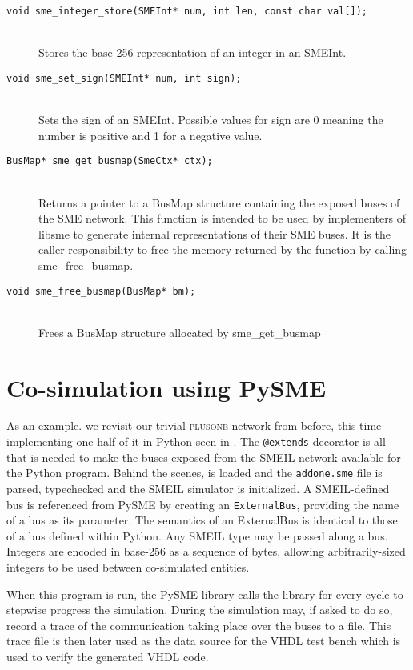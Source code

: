 \begin{description}
 \item[\texttt{void sme_integer_store(SMEInt* num, int len, const char val[]);}]\hfill\\
    Stores the base-256 representation of an integer in an SMEInt.
  \item[\texttt{void sme_set_sign(SMEInt* num, int sign);}]\hfill\\
    Sets the sign of an SMEInt. Possible values for sign are 0 meaning the number
    is positive and 1 for a negative value.
 \item[\texttt{BusMap* sme_get_busmap(SmeCtx* ctx);}]\hfill\\
   Returns a pointer to a BusMap structure containing the exposed buses of the
   SME network. This function is intended to be used by implementers of libsme
   to generate internal representations of their SME buses. It is the caller
   responsibility to free the memory returned by the function by calling
   sme_free_busmap.
\item[\texttt{void sme_free_busmap(BusMap* bm);}]\hfill\\
   Frees a BusMap structure allocated by sme_get_busmap
\end{description}

\section{Co-simulation using PySME}
As an example. we revisit our trivial \textsc{plusone} network from before, this
time implementing one half of it in Python seen in . The
\texttt{@extends} decorator is all that is needed to make the buses exposed from
the SMEIL network available for the Python program. Behind the scenes, \libsme{}
is loaded and the \texttt{addone.sme} file is parsed, typechecked and the
\libsme{} SMEIL simulator is initialized. A SMEIL-defined bus is referenced from
PySME by creating an \texttt{ExternalBus}, providing the name of a bus as its
parameter. The semantics of an {\ttfamily ExternalBus} is identical to those of a bus
defined within Python. Any SMEIL type may be passed along a bus. Integers are
encoded in base-256 as a sequence of bytes, allowing arbitrarily-sized integers
to be used between co-simulated entities.

When this program is run, the PySME library calls the \libsme{} library for
every cycle to stepwise progress the simulation. During the simulation \libsme{}
may, if asked to do so, record a trace of the communication taking place over
the buses to a file. This trace file is then later used as the data source for
the VHDL test bench which is used to verify the generated VHDL code.

